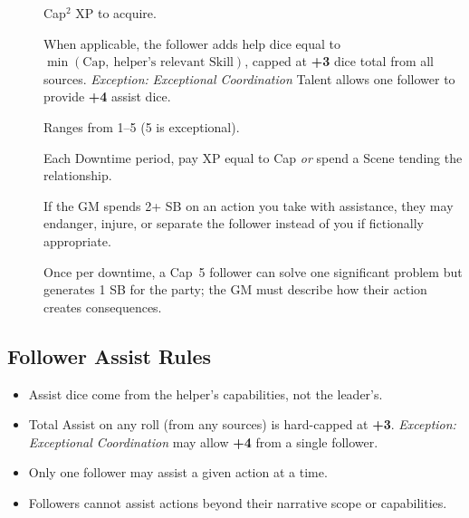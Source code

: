 \begin{description}
\item[] Cap$^{2}$ XP to acquire. 
\item[] When applicable, the follower adds help dice equal to $\min(\text{Cap},\ \text{helper's relevant Skill})$, capped at \textbf{+3} dice total from all sources. \emph{Exception:} \textit{Exceptional Coordination} Talent allows one follower to provide \textbf{+4} assist dice. 
\item[] Ranges from 1--5 (5 is exceptional). 
\item[] Each Downtime period, pay XP equal to Cap \emph{or} spend a Scene tending the relationship. 
\item[] If the GM spends 2+ SB on an action you take with assistance, they may endanger, injure, or separate the follower instead of you if fictionally appropriate. 
\item[] Once per downtime, a Cap~5 follower can solve one significant problem but generates 1 SB for the party; the GM must describe how their action creates consequences. 
\end{description}

\subsection{Follower Assist Rules}
\label{subsec:follower-assist}

\begin{itemize}
    \item Assist dice come from the helper's capabilities, not the leader's. 
    \item Total Assist on any roll (from any sources) is hard-capped at \textbf{+3}. \emph{Exception:} \textit{Exceptional Coordination} may allow \textbf{+4} from a single follower. 
    \item Only one follower may assist a given action at a time. 
    \item Followers cannot assist actions beyond their narrative scope or capabilities.
\end{itemize}


